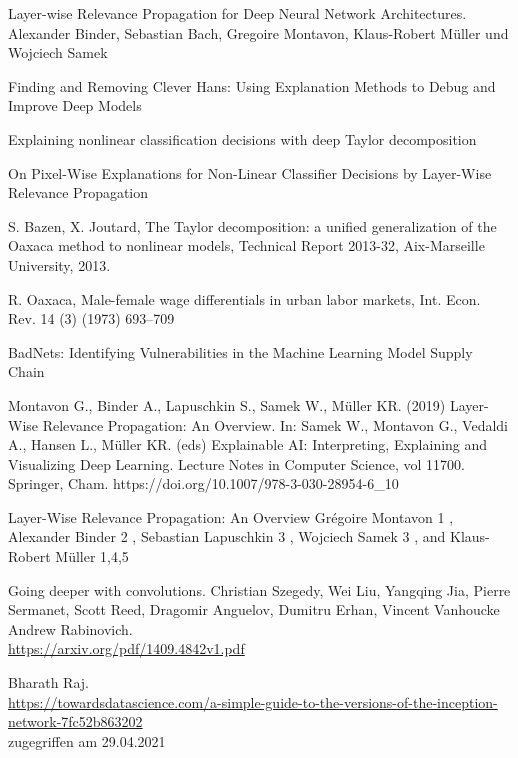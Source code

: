 \begin{thebibliography}{}
		 Layer-wise Relevance Propagation for Deep
		Neural Network Architectures. Alexander Binder, Sebastian Bach, Gregoire Montavon, Klaus-Robert Müller und Wojciech Samek
		
		Finding and Removing Clever Hans:
		Using Explanation Methods to Debug and Improve Deep Models
		
		 Explaining nonlinear classification decisions with deep Taylor
		decomposition
		
		 On Pixel-Wise Explanations for Non-Linear
		Classifier Decisions by Layer-Wise Relevance
		Propagation
		
		 S. Bazen, X. Joutard, The Taylor decomposition: a unified generalization of the
		Oaxaca method to nonlinear models, Technical Report 2013-32, Aix-Marseille
		University, 2013.
		
		 R. Oaxaca, Male-female wage differentials in urban labor markets, Int. Econ. Rev.
		14 (3) (1973) 693–709
		
		 BadNets: Identifying Vulnerabilities in the Machine Learning Model Supply Chain
		
		Montavon G., Binder A., Lapuschkin S., Samek W., Müller KR. (2019) Layer-Wise Relevance Propagation: An Overview. In: Samek W., Montavon G., Vedaldi A., Hansen L., Müller KR. (eds) Explainable AI: Interpreting, Explaining and Visualizing Deep Learning. Lecture Notes in Computer Science, vol 11700. Springer, Cham. https://doi.org/10.1007/978-3-030-28954-6\_10
		
		 Layer-Wise Relevance Propagation:
		An Overview
		Grégoire Montavon 1 , Alexander Binder 2 , Sebastian Lapuschkin 3 , Wojciech
		Samek 3 , and Klaus-Robert Müller 1,4,5
		
		Going deeper with convolutions. Christian Szegedy, Wei Liu, Yangqing Jia, Pierre Sermanet, Scott Reed, Dragomir Anguelov, Dumitru Erhan, Vincent Vanhoucke Andrew Rabinovich.\\
		\url{https://arxiv.org/pdf/1409.4842v1.pdf}
		
		Bharath Raj.\\
		\url{https://towardsdatascience.com/a-simple-guide-to-the-versions-of-the-inception-network-7fc52b863202}\\
		zugegriffen am 29.04.2021
		

\end{thebibliography}

